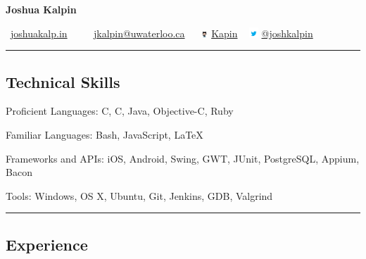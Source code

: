 \documentclass[10pt,letterpaper]{article}
\newenvironment{indentsection}[1]%
{\begin{list}{}%
	{\setlength{\leftmargin}{#1}}%
	\item[]%
}
{\end{list}}
\newcommand{\CPP}
{C\nolinebreak[4]\hspace{-.05em}\raisebox{.22ex}{\footnotesize\bf ++}}
\begin{document}
\begin{center}
{\LARGE \textbf{Joshua Kalpin}}
\vspace{0.1cm}

\Mundus \ \href{http://joshuakalp.in}{joshuakalp.in} \ \textbullet
\ \ \Letter \ \href{mailto:jkalpin@uwaterloo.ca}{jkalpin@uwaterloo.ca} \ \textbullet
\ \includegraphics[height=6pt]{Octocat} 
\href{https://github.com/kapin}{Kapin} \ \textbullet
 \includegraphics[height=10pt]{twitter}
\href{https://twitter.com/joshkalpin}{@joshkalpin}
\end{center}

\hrule
\vspace{-0.4em}
\subsection*{Technical Skills}

\begin{indentsection}{\parindent}
\begin{description*}
	\item[Proficient Languages:]
	C, \CPP, Java, Objective-C, Ruby
	\item[Familiar Languages:]
	Bash, JavaScript, \LaTeX
	\item[Frameworks and APIs:]
	iOS, Android, Swing, GWT, JUnit, PostgreSQL, Appium, Bacon
	\item[Tools:]
	Windows, OS X, Ubuntu, Git, Jenkins, GDB, Valgrind
\end{description*}
\end{indentsection}

\hrule
\vspace{-0.4em}
\subsection*{Experience}
\end{document}
